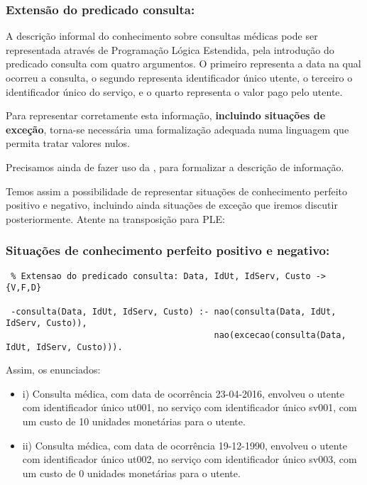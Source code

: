 \documentclass[
  oneside,
  10pt, a4paper,
  footinclude=true,
  headinclude=true,
  cleardoublepage=empty
]{scrbook}
\begin{document}
        \subsubsection{\textbf{Extensão do predicado consulta:}}
        
        A descrição informal do conhecimento sobre consultas médicas pode ser representada através de Programação Lógica Estendida, pela introdução do predicado consulta com quatro argumentos. O primeiro representa a data na qual ocorreu a consulta, o segundo representa identificador único utente, o terceiro o identificador único do serviço, e o quarto representa o valor pago pelo utente.\par 
        
Para representar corretamente esta informação, \textbf{incluindo situações de exceção}, torna-se necessária uma formalização adequada  numa linguagem que permita tratar valores nulos. \par
Precisamos ainda de fazer uso da , para formalizar a descrição de informação.\par 
Temos assim a possibilidade de representar situações de conhecimento perfeito positivo e negativo, incluindo ainda situações de exceção que iremos discutir posteriormente. Atente na transposição para PLE:\par 
\subsubsection{\textbf{Situações de conhecimento perfeito positivo e negativo:}}
\label{pred_consulta}
\begin{lstlisting}
 % Extensao do predicado consulta: Data, IdUt, IdServ, Custo -> {V,F,D}
 
 -consulta(Data, IdUt, IdServ, Custo) :- nao(consulta(Data, IdUt, IdServ, Custo)),
                                         nao(excecao(consulta(Data, IdUt, IdServ, Custo))).
\end{lstlisting}

Assim, os enunciados: 
\begin{itemize}
\item i) Consulta médica, com data de ocorrência 23-04-2016, envolveu o utente com identificador único ut001, no serviço com identificador único sv001, com um custo de 10 unidades monetárias para o utente.
\item ii) Consulta médica, com data de ocorrência 19-12-1990, envolveu o utente com identificador único ut002, no serviço com identificador único sv003, com um custo de 0 unidades monetárias para o utente.
\end{itemize}
\end{document}
